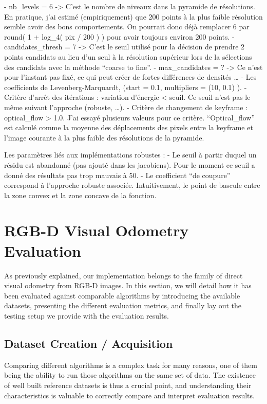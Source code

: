 - nb\_levels = 6 -> C’est le nombre de niveaux dans la pyramide de résolutions. En pratique, j’ai estimé (empiriquement) que 200 points à la plus faible résolution semble avoir des bons comportements. On pourrait donc déjà remplacer 6 par round( 1 + log\_4( pix / 200 ) ) pour avoir toujours environ 200 points.
- candidates\_thresh = 7 -> C’est le seuil utilisé pour la décision de prendre 2 points candidats au lieu d’un seul à la résolution supérieur lors de la sélections des candidats avec la méthode “coarse to fine”.
- max\_candidates = ? -> Ce n’est pour l’instant pas fixé, ce qui peut créer de fortes différences de densités …
- Les coefficients de Levenberg-Marquardt, (start = 0.1, multipliers = (10, 0.1) ).
- Critère d’arrêt des itérations : variation d’énergie < seuil. Ce seuil n’est pas le même suivant l’approche (robuste, …).
- Critère de changement de keyframe : optical\_flow > 1.0. J’ai essayé plusieurs valeurs pour ce critère. “Optical\_flow” est calculé comme la moyenne des déplacements des pixels entre la keyframe et l’image courante à la plus faible des résolutions de la pyramide.

Les paramètres liés aux implémentations robustes :
- Le seuil à partir duquel un résidu est abandonné (pas ajouté dans les jacobiens). Pour le moment ce seuil a donné des résultats pas trop mauvais à 50.
- Le coefficient “de coupure” correspond à l’approche robuste associée. Intuitivement, le point de bascule entre la zone convex et la zone concave de la fonction.

\section{RGB-D Visual Odometry Evaluation}%
\label{sec:rgbd-vo-evaluation}

As previously explained, our implementation
belongs to the family of direct visual odometry from RGB-D images.
In this section, we will detail how it has been evaluated against
comparable algorithms by introducing the available datasets,
presenting the different evaluation metrics,
and finally lay out the testing setup we provide with the evaluation results.

\subsection{Dataset Creation / Acquisition}%
\label{sub:dataset_creation}

Comparing different algorithms is a complex task for many reasons,
one of them being the ability to run those algorithms on the same set of data.
The existence of well built reference datasets is thus a crucial point,
and understanding their characteristics is valuable to correctly compare and interpret
evaluation results.

